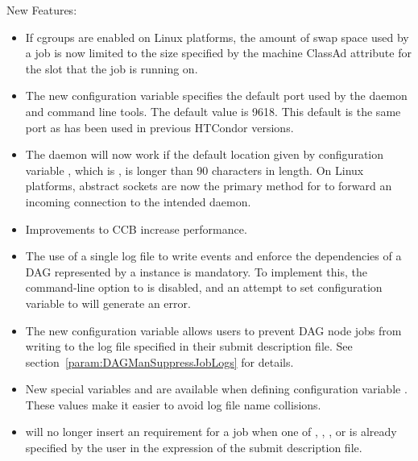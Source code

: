 \noindent New Features:

\begin{itemize}

\item If cgroups are enabled on Linux platforms, 
the amount of swap space used by a job is now limited to the 
size specified by the machine ClassAd attribute  
for the slot that the job is running on.

\item The new configuration variable  specifies
the default port used by the  daemon and command line tools.
The default value is 9618.
This default is the same port as has been used in previous HTCondor versions.

\item The  daemon will now work 
if the default location given by configuration variable
, which is ,
is longer than 90 characters in length.
On Linux platforms, abstract sockets are now the primary method for
 to forward an incoming connection to the intended
daemon.

\item Improvements to CCB increase performance.

\item The use of a single log file to write events and enforce the 
dependencies of a DAG represented by a  instance is mandatory.
To implement this,
the  command-line
option to  is disabled,
and an attempt to set configuration variable
 to  will generate an
error.

\item The new  configuration variable
 allows users to prevent DAG node
jobs from writing to the log file specified in their submit description file.
See section~\ref{param:DAGManSuppressJobLogs} for details.

\item New special variables  and  are
available when defining configuration variable
.
These values make it easier to avoid log file name collisions.

\item {} will no longer insert an  requirement
for a job
when one of , , ,
or  is already specified by the user in
the  expression of the submit description file.


\end{itemize}
